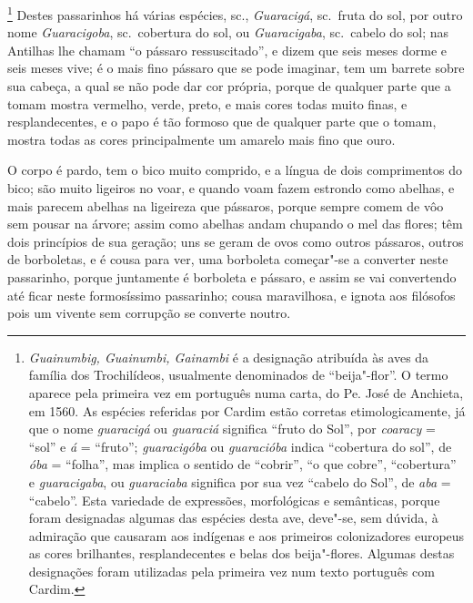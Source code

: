 \footnote{ \textit{Guainumbig, Guainumbi,
Gainambi} é a designação atribuída às aves da família dos
Trochilídeos, usualmente denominados de ``beija"-flor''. O termo aparece
pela primeira vez em português numa carta, do Pe. José de
Anchieta, em 1560. As espécies referidas por Cardim estão corretas
etimologicamente, já que o nome \textit{guaracigá} ou \textit{guaraciá}
significa ``fruto do Sol'', por \textit{coaracy} = ``sol'' e
\textit{á} = ``fruto''; \textit{guaracigóba} ou \textit{guaracióba}
indica ``cobertura do sol'', de \textit{óba} = ``folha'', mas
implica o sentido de ``cobrir'', ``o que cobre'', ``cobertura'' e
\textit{guaracigaba}, ou \textit{guaraciaba} significa por sua vez
``cabelo do Sol'', de \textit{aba} = ``cabelo''. Esta variedade de
expressões, morfológicas e semânticas, porque foram designadas algumas
das espécies desta ave, deve"-se, sem dúvida, à admiração que causaram
aos indígenas e aos primeiros colonizadores europeus as cores
brilhantes, resplandecentes e belas dos beija"-flores. Algumas destas
designações foram utilizadas pela primeira vez num texto português com
Cardim.} Destes passarinhos há várias espécies, sc.,
\textit{Guaracigá}, sc.~fruta do sol, por outro nome
\textit{Guaracigoba}, sc.~cobertura do sol, ou \textit{Guaracigaba}, 
sc.~cabelo do sol; nas Antilhas lhe chamam ``o pássaro ressuscitado'', e
dizem que seis meses dorme e seis meses vive; é o mais fino pássaro que
se pode imaginar, tem um barrete sobre sua cabeça, a qual se não pode
dar cor própria, porque de qualquer parte que a tomam mostra vermelho,
verde, preto, e mais cores todas muito finas, e resplandecentes, e o
papo é tão formoso que de qualquer parte que o tomam, mostra todas as
cores principalmente um amarelo mais fino que ouro.

 O corpo é pardo, tem o bico muito comprido, e a língua de dois
comprimentos do bico; são muito ligeiros no voar, e quando voam fazem
estrondo como abelhas, e mais parecem abelhas na ligeireza que
pássaros, porque sempre comem de vôo sem pousar na árvore; assim como
abelhas andam chupando o mel das flores; têm dois princípios de sua
geração; uns se geram de ovos como outros pássaros, outros de
borboletas, e é cousa para ver, uma borboleta começar"-se a converter
neste passarinho, porque juntamente é borboleta e pássaro, e assim se
vai convertendo até ficar neste formosíssimo passarinho; cousa
maravilhosa, e ignota aos filósofos pois um vivente sem corrupção se
converte noutro.

